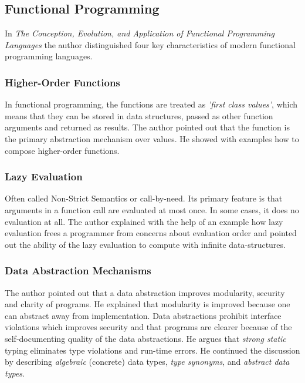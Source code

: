 \documentclass[12pt,twoside,a4paper]{report}
\begin{document}
\subsection{Functional Programming}\label{2.3.2}
In \textit{The Conception, Evolution, and Application of Functional Programming Languages}\cite{12} the author distinguished four key characteristics of modern functional programming languages.
\subsubsection{Higher-Order Functions}
In functional programming, the functions are treated as \textit{'first class values'}, which means that they can be stored in data structures, passed as other function arguments and returned as results. The author pointed out that the function is the primary abstraction mechanism over values. He showed with examples how to compose higher-order functions.
\subsubsection{Lazy Evaluation}
Often called Non-Strict Semantics or call-by-need. Its primary feature is that arguments in a function call are evaluated at most once. In some cases, it does no evaluation at all. The author
explained with the help of an example how lazy evaluation frees a programmer from concerns about evaluation order and pointed out the ability of the lazy evaluation to compute with infinite
data-structures.
\subsubsection{Data Abstraction Mechanisms}
The author pointed out that a data abstraction improves modularity, security and clarity of programs. He explained that modularity is improved because one can abstract away from
implementation. Data abstractions prohibit interface violations which improves security and that programs are clearer because of the self-documenting quality of the data abstractions. He argues
that \textit{strong static} typing eliminates type violations and run-time errors. He continued the discussion by describing \textit{algebraic} (concrete) data types, \textit{type synonyms}, and \textit{abstract data types}.
\end{document}
